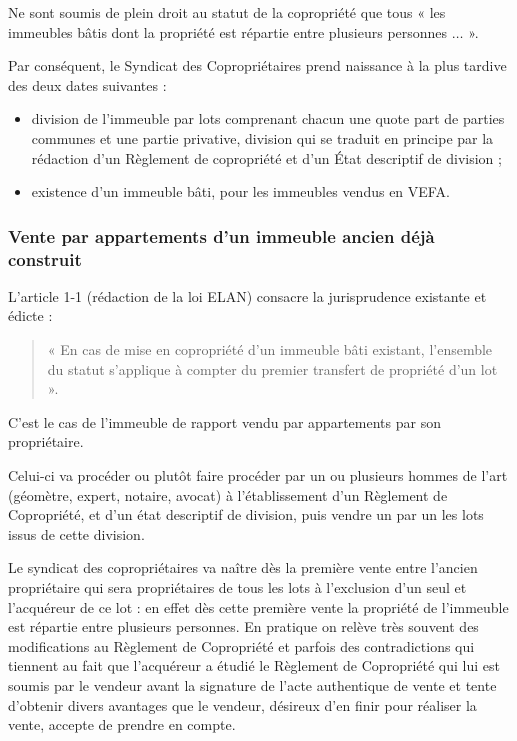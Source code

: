 		Ne sont soumis de plein droit au statut de la copropriété que tous « les immeubles bâtis dont la propriété est répartie entre plusieurs personnes $\dots$ ».
		
		Par conséquent, le Syndicat des Copropriétaires prend naissance à la plus tardive des deux dates suivantes :
		\begin{itemize}
			\item division de l’immeuble par lots comprenant chacun une quote part de parties communes et une partie privative, division qui se traduit en principe par la rédaction d’un Règlement de copropriété et d’un État descriptif de division ;
			\item existence d’un immeuble bâti, pour les immeubles vendus en VEFA.
		\end{itemize}
		
		\subsubsection{Vente par appartements d'un immeuble ancien déjà construit}
		
			L’article 1\ier{}-1 (rédaction de la loi ELAN) consacre la jurisprudence existante et édicte :
			\begin{quote}
				« En cas de mise en copropriété d’un immeuble bâti existant, l’ensemble du statut s’applique à compter du premier transfert de propriété d’un lot ».
			\end{quote}
			
			C'est le cas de l'immeuble de rapport vendu par appartements par son propriétaire.
			
			Celui-ci va procéder ou plutôt faire procéder par un ou plusieurs hommes de l'art (géomètre, expert, notaire, avocat) à l'établissement d'un Règlement de Copropriété, et d’un état descriptif de division, puis vendre un par un les lots issus de cette division.
	
			Le syndicat des copropriétaires va naître dès la première vente entre l'ancien propriétaire qui sera propriétaires de tous les lots à l'exclusion d'un seul et l'acquéreur de ce lot : en effet dès cette première vente la propriété de l'immeuble est répartie entre plusieurs personnes.
			En pratique on relève très souvent des modifications au Règlement de Copropriété et parfois des contradictions qui tiennent au fait que l'acquéreur a étudié le Règlement de Copropriété qui lui est soumis par le vendeur avant la signature de l'acte authentique de vente et tente d'obtenir divers avantages que le vendeur, désireux d'en finir pour réaliser la vente, accepte de prendre en compte.
		
